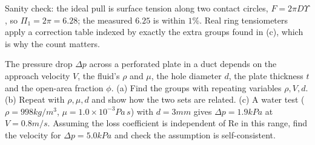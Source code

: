 Sanity check: the ideal pull is surface tension along two contact circles, $F = 2\pi D\Upsilon$, so $\Pi_1 = 2\pi = 6.28$; the measured $6.25$ is within $1\%$. Real ring tensiometers apply a correction table indexed by exactly the extra groups found in (c), which is why the count matters.

\begin{example}
The pressure drop $\Delta p$ across a perforated plate in a duct depends on the approach velocity $V$, the fluid's $\rho$ and $\mu$, the hole diameter $d$, the plate thickness $t$ and the open-area fraction $\phi$.
(a) Find the groups with repeating variables $\rho, V, d$.
(b) Repeat with $\rho, \mu, d$ and show how the two sets are related.
(c) A water test ($\rho = 998\unit{kg/m^3}$, $\mu = 1.0\times10^{-3}\unit{Pa\,s}$) with $d = 3\unit{mm}$ gives $\Delta p = 1.9\unit{kPa}$ at $V = 0.8\unit{m/s}$. Assuming the loss coefficient is independent of $\mathrm{Re}$ in this range, find the velocity for $\Delta p = 5.0\unit{kPa}$ and check the assumption is self-consistent.
\end{example}

